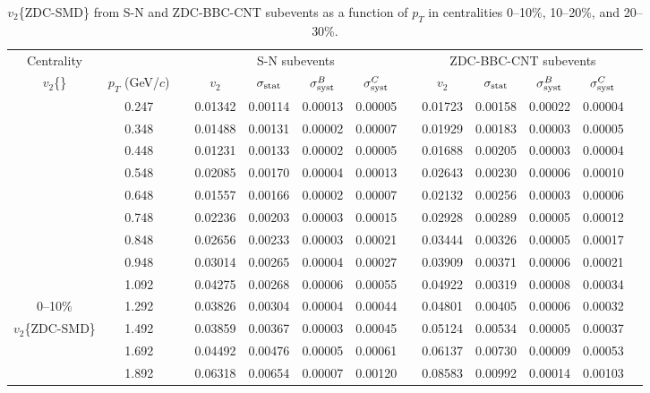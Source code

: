 \documentclass[aps,prc,superscriptaddress,showpacs,floatfix,twocolumn]{revtex4}
\newcommand \gevc{GeV/$c$\xspace}
\newcommand \pt{\mbox{$p_T$}\xspace}
\begin{document}
\begin{table}[htbp]
\caption{\label{tab:table_v2zdc_smd_cent0-30}
$v_2$\{ZDC-SMD\} from S-N and ZDC-BBC-CNT subevents as a function of \pt in centralities
0--10\%, 10--20\%, and 20--30\%.
}
\begingroup \squeezetable
\begin{ruledtabular} \begin{tabular}{c|cccccccccccc}
Centrality
 & & & \multicolumn{4}{c}{S-N subevents} & & \multicolumn{4}{c}{ZDC-BBC-CNT subevents} \\ 
$v_2$\{\}
 &$\pt$ (\gevc) & & $v_2$ & $\sigma_{\rm stat}$ & $\sigma_{\rm syst}^B$ & $\sigma_{\rm syst}^C$ 
& & $v_2$ & $\sigma_{\rm stat}$ & $\sigma_{\rm syst}^B$ & $\sigma_{\rm syst}^C$ \\ 
\hline
 & 0.247 && 0.01342 & 0.00114 & 0.00013 & 0.00005 & & 0.01723 & 0.00158 & 0.00022 & 0.00004 \\ 
 & 0.348 && 0.01488 & 0.00131 & 0.00002 & 0.00007 & & 0.01929 & 0.00183 & 0.00003 & 0.00005 \\ 
 & 0.448 && 0.01231 & 0.00133 & 0.00002 & 0.00005 & & 0.01688 & 0.00205 & 0.00003 & 0.00004 \\ 
 & 0.548 && 0.02085 & 0.00170 & 0.00004 & 0.00013 & & 0.02643 & 0.00230 & 0.00006 & 0.00010 \\ 
 & 0.648 && 0.01557 & 0.00166 & 0.00002 & 0.00007 & & 0.02132 & 0.00256 & 0.00003 & 0.00006 \\ 
 & 0.748 && 0.02236 & 0.00203 & 0.00003 & 0.00015 & & 0.02928 & 0.00289 & 0.00005 & 0.00012 \\ 
 & 0.848 && 0.02656 & 0.00233 & 0.00003 & 0.00021 & & 0.03444 & 0.00326 & 0.00005 & 0.00017 \\ 
 & 0.948 && 0.03014 & 0.00265 & 0.00004 & 0.00027 & & 0.03909 & 0.00371 & 0.00006 & 0.00021 \\ 
 & 1.092 && 0.04275 & 0.00268 & 0.00006 & 0.00055 & & 0.04922 & 0.00319 & 0.00008 & 0.00034 \\ 
0--10\%
 & 1.292 && 0.03826 & 0.00304 & 0.00004 & 0.00044 & & 0.04801 & 0.00405 & 0.00006 & 0.00032 \\ 
$v_2$\{ZDC-SMD\}
 & 1.492 && 0.03859 & 0.00367 & 0.00003 & 0.00045 & & 0.05124 & 0.00534 & 0.00005 & 0.00037 \\ 
 & 1.692 && 0.04492 & 0.00476 & 0.00005 & 0.00061 & & 0.06137 & 0.00730 & 0.00009 & 0.00053 \\ 
 & 1.892 && 0.06318 & 0.00654 & 0.00007 & 0.00120 & & 0.08583 & 0.00992 & 0.00014 & 0.00103 \\ 

\end{tabular}
\end{ruledtabular}
\end{table}
\end{document}
